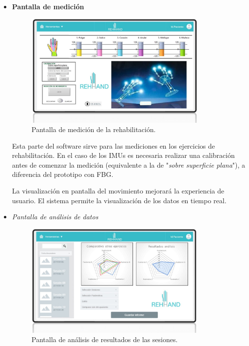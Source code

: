 \begin{itemize}
	\item \textbf{Pantalla de medición}
	
	\begin{figure}[H]
		\centering
		\includegraphics[width=0.85\textwidth]{./img/softwareIMU1}
		\caption{Pantalla de medición de la rehabilitación. } 
		\label{fig:softIMU1}
	\end{figure} 
	 
	 Esta parte del software sirve para las mediciones en los ejercicios de rehabilitación. En el caso de los IMUs es necesaria realizar una calibración antes de comenzar la medición (equivalente a la de "\textit{sobre superficie plana}"), a diferencia del prototipo con FBG.
	 
	 La visualización en pantalla del movimiento mejorará la experiencia de usuario. El sistema permite la visualización de los datos en tiempo real.
	
	\item \textit{Pantalla de análisis de datos}
	
	\begin{figure}[H]
		\centering
		\includegraphics[width=0.85\textwidth]{./img/softwareIMU2}
		\caption{Pantalla de análisis de resultados de las sesiones. } 
		\label{fig:softIMU2}
	\end{figure} 
	

\end{itemize}
